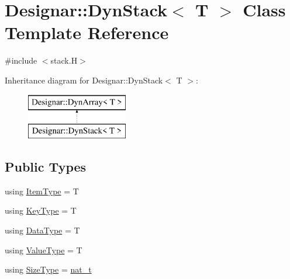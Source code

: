 \hypertarget{class_designar_1_1_dyn_stack}{}\section{Designar\+:\+:Dyn\+Stack$<$ T $>$ Class Template Reference}
\label{class_designar_1_1_dyn_stack}


{\ttfamily \#include $<$stack.\+H$>$}

Inheritance diagram for Designar\+:\+:Dyn\+Stack$<$ T $>$\+:\begin{figure}[H]
\begin{center}
\leavevmode
\includegraphics[height=2.000000cm]{class_designar_1_1_dyn_stack}
\end{center}
\end{figure}
\subsection*{Public Types}
\begin{DoxyCompactItemize}
\item 
using \hyperlink{class_designar_1_1_dyn_stack_a2e50015faeef3234802046097db79f73}{Item\+Type} = T
\item 
using \hyperlink{class_designar_1_1_dyn_stack_a4a4fd39e08b25a05641fb888b99261c8}{Key\+Type} = T
\item 
using \hyperlink{class_designar_1_1_dyn_stack_afb7dc9ebd5c844450d997e38b195f3bb}{Data\+Type} = T
\item 
using \hyperlink{class_designar_1_1_dyn_stack_a511da1dd717eb6f9c5b143b2a8543176}{Value\+Type} = T
\item 
using \hyperlink{class_designar_1_1_dyn_stack_adb2c839a5bc34354be458c86dd35f5b8}{Size\+Type} = \hyperlink{namespace_designar_aa72662848b9f4815e7bf31a7cf3e33d1}{nat\+\_\+t}
\end{DoxyCompactItemize}
